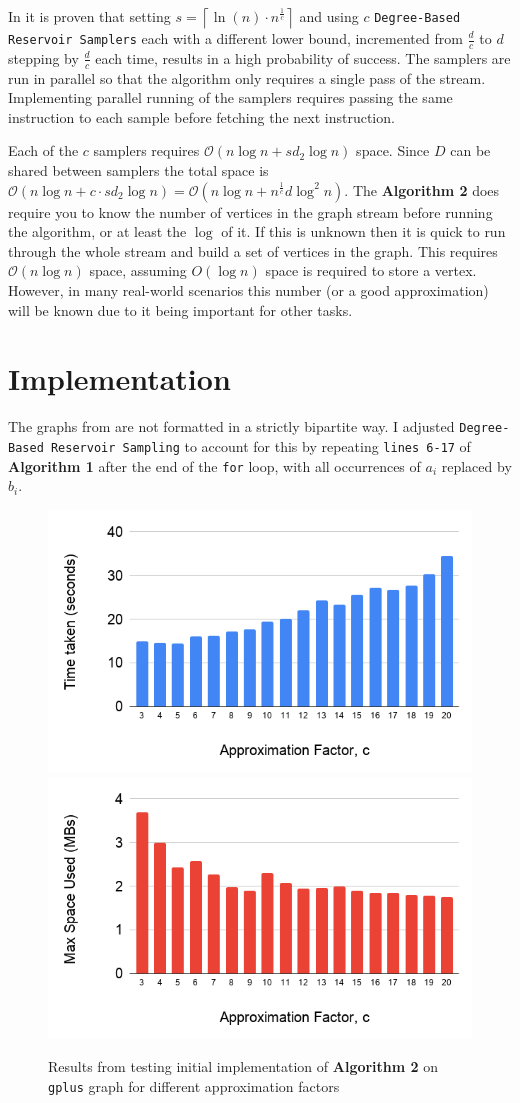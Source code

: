 \documentclass[11pt,twoside,a4paper]{report}
\begin{document}
\par In \cite{orig} it is proven that setting $s=\left\lceil\ln(n)\cdot n^{\frac1c}\right\rceil$ and using $c$ \texttt{Degree-Based Reservoir Samplers} each with a different lower bound, incremented from $\frac{d}c$ to $d$ stepping by $\frac{d}c$ each time, results in a high probability of success. The samplers are run in parallel so that the algorithm only requires a single pass of the stream. Implementing parallel running of the samplers requires passing the same instruction to each sample before fetching the next instruction.

\par Each of the $c$ samplers requires $\mathcal{O}(n\log n+sd_2\log n)$ space. Since $D$ can be shared between samplers the total space is $\mathcal{O}(n\log n+c\cdot sd_2\log n)=\mathcal{O}(n\log n+n^{\frac1c}d\log^2n)$. The \textbf{Algorithm 2} does require you to know the number of vertices in the graph stream before running the algorithm, or at least the $\log$ of it. If this is unknown then it is quick to run through the whole stream and build a set of vertices in the graph. This requires $\mathcal{O}(n\log n)$ space, assuming $O(\log n)$ space is required to store a vertex. However, in many real-world scenarios this number (or a good approximation) will be known due to it being important for other tasks.

\section{Implementation}

\par The graphs from \cite{SNAP} are not formatted in a strictly bipartite way. I adjusted \texttt{Degree-Based Reservoir Sampling} to account for this by repeating \texttt{lines 6-17} of \textbf{Algorithm 1} after the end of the \texttt{for} loop, with all occurrences of $a_i$ replaced by $b_i$.

\begin{figure}[H]
	\label{Figure 2}
	\includegraphics[width=.5\textwidth]{img/gplusInitialTime.png}
	\includegraphics[width=.5\textwidth]{img/gplusInitialSpace.png}
	\caption{Results from testing initial implementation of \textbf{Algorithm 2} on \texttt{gplus} graph for different approximation factors}
\end{figure}
\end{document}
